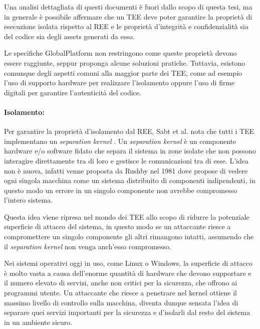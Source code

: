 \documentclass[12pt,italian]{report}
\begin{document}
Una analisi dettagliata di questi documenti è fuori dallo scopo di questa
tesi, ma in generale è possibile affermare che un TEE deve poter garantire
la proprietà di esecuzione isolata rispetto al REE e le proprietà d'integrità
e confidenzialità sia del codice sia degli assets generati da esso.

Le specifiche GlobalPlatform non restringono come queste proprietà devono
essere raggiunte, seppur proponga alcune soluzioni pratiche.
Tuttavia, esistono comunque degli aspetti comuni alla maggior parte dei
TEE, come ad esempio l'uso di supporto hardware per realizzare l'isolamento
oppure l'uso di firme digitali per garantire l'autenticità del codice.

\paragraph{Isolamento:}
Per garantire la proprietà d'isolamento dal REE,
Sabt et al.\cite{sabt2015tee} nota
che tutti i TEE implementano un \textit{separation kernel}
\cite{rushby1981separationkernel}. 
Un \textit{separation kernel} è un componente hardware e/o software fidato che
separa il sistema in zone isolate che non possono
interagire direttamente tra di loro e gestisce le comunicazioni tra di esse.
L'idea non è nuova, infatti venne proposta da Rushby nel 1981 dove propose
di vedere ogni singola macchina come un sistema distribuito di componenti
indipendenti, in questo modo un errore in un singolo componente non avrebbe
compromesso l'intero sistema.

Questa idea viene ripresa nel mondo dei TEE allo scopo di ridurre la
potenziale superficie di attacco del sistema, in questo modo se un
attaccante riesce a compromettere un singolo componente gli altri rimangono
intatti, assumendo che il \textit{separation kernel} non venga anch'esso
compromesso.

Nei sistemi operativi oggi in uso, come Linux o Windows, la superficie di
attacco è molto vasta a causa dell'enorme quantità di hardware che devono
supportare e il numero elevato di servizi, anche non critici per la sicurezza,
che offrono ai programmi utente. 
Un attaccante che riesce a penetrare nel kernel ottiene il massimo livello di
controllo sulla macchina, diventa dunque sensata l'idea di separare quei
servizi importanti per la sicurezza e d'isolarli dal resto del sistema in
un ambiente sicuro.
\end{document}
